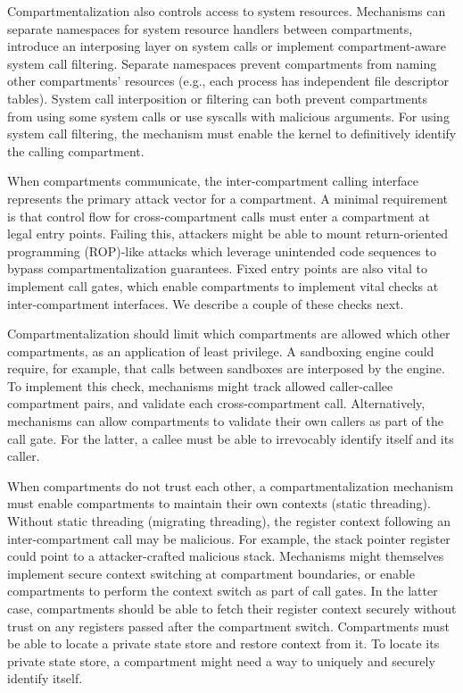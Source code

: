Compartmentalization also controls access to system resources.
Mechanisms can separate namespaces for system resource handlers between
compartments, introduce an interposing layer on system calls or 
implement compartment-aware system call filtering.
Separate namespaces prevent compartments from naming other compartments'
resources (e.g., each process has independent file descriptor tables).
System call interposition or filtering can both prevent compartments from
using some system calls or use syscalls with malicious arguments.
For using system call filtering, the mechanism must enable the kernel to
definitively identify the calling compartment.

When compartments communicate, the inter-compartment calling interface 
represents the primary attack vector for a compartment. 
A minimal requirement is that control flow for cross-compartment calls
must enter a compartment at legal entry points.
Failing this, attackers might be able to mount 
return-oriented programming (ROP)-like attacks which leverage unintended
code sequences to bypass compartmentalization guarantees.
Fixed entry points are also vital to implement call gates, which enable
compartments to implement vital checks at inter-compartment interfaces.
We describe a couple of these checks next.

Compartmentalization should limit which compartments are allowed which other
compartments, as an application of least privilege. 
A sandboxing engine could require, for example, that calls between sandboxes
are interposed by the engine.
To implement this check, mechanisms might track allowed caller-callee 
compartment pairs, and validate each cross-compartment call.
Alternatively, mechanisms can allow compartments to validate their own
callers as part of the call gate.
For the latter, a callee must be able to irrevocably identify itself and its 
caller.

When compartments do not trust each other, a compartmentalization mechanism
must enable compartments to maintain their own contexts (static threading).
Without static threading (migrating threading), the register context following
an inter-compartment call may be malicious.
For example, the stack pointer register could point to a attacker-crafted
malicious stack.
Mechanisms might themselves implement secure context switching at compartment
boundaries, or enable compartments to perform the context switch as part of
call gates.
In the latter case, compartments should be able to fetch their register context
securely without trust on any registers passed after the compartment switch.
Compartments must be able to locate a private state store and
restore context from it.
To locate its private state store, a compartment might need a way to uniquely
and securely identify itself. 

